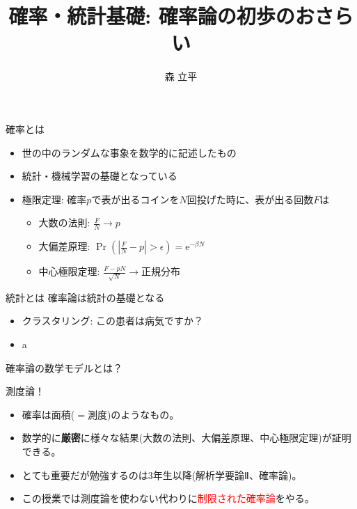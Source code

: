 \documentclass[lualatex,handout]{beamer}
\title{確率・統計基礎: 確率論の初歩のおさらい}
\author{森 立平}
\date{}
\newcommand{\emm}[1]{\textcolor{red}{#1}}
\theoremstyle{definition}
\begin{document}
\begin{frame}[plain]
\maketitle
\end{frame}


\begin{frame}{確率とは}
\begin{itemize}
\setlength{\itemsep}{2em}
\item 世の中のランダムな事象を数学的に記述したもの
\item 統計・機械学習の基礎となっている
\item 極限定理: 確率$p$で表が出るコインを$N$回投げた時に、表が出る回数$F$は
\vspace{1em}
\begin{itemize}
\setlength{\itemsep}{1em}
\item 大数の法則: $\frac{F}{N} \to p$
\item 大偏差原理: $\Pr\left(\left|\frac{F}{N} - p\right| > \epsilon\right) = \mathrm{e}^{-\beta N}$
\item 中心極限定理: $\frac{F-pN}{\sqrt{N}}\to$正規分布
\end{itemize}
\end{itemize}
\end{frame}

\begin{frame}{統計とは}
確率論は統計の基礎となる
\vspace{1em}
\begin{itemize}
\item クラスタリング: この患者は病気ですか？
\item a
\end{itemize}
\end{frame}

\begin{frame}{確率論の数学モデルとは？}
\begin{center}
\large 測度論！
\end{center}

\vspace{1em}
\begin{itemize}
\setlength{\itemsep}{2em}
\item 確率は面積($=$測度)のようなもの。
\item 数学的に\textbf{厳密}に様々な結果(大数の法則、大偏差原理、中心極限定理)が証明できる。
\item とても重要だが勉強するのは3年生以降(解析学要論Ⅱ、確率論)。
\item この授業では測度論を使わない代わりに\emm{制限された確率論}をやる。
\end{itemize}
\end{frame}
\end{document}
